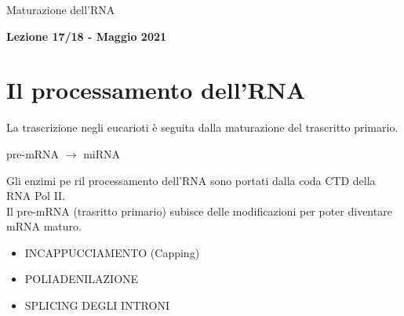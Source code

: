 \documentclass{article}
\begin{document}
\begin{titlepage}
    \begin{center}
        \vspace*{1cm}
        \huge
        Maturazione dell'RNA
            
        \vspace{1.5cm}
        
        \Large
        \textbf{Lezione 17/18 - Maggio 2021}

        \vspace{0.8cm}

    \end{center}
\end{titlepage}
\setcounter{page}{69}
\section{Il processamento dell'RNA}
La trascrizione negli eucarioti è seguita dalla maturazione del trascritto primario.
\begin{center}
    pre-mRNA $\rightarrow$ miRNA
\end{center}
Gli enzimi pe ril processamento dell'RNA sono portati dalla coda CTD della RNA Pol II.\\
Il pre-mRNA (trasritto primario) subisce delle modificazioni per poter diventare mRNA maturo.
\begin{itemize}
    \item INCAPPUCCIAMENTO (Capping)
    \item POLIADENILAZIONE
    \item SPLICING DEGLI INTRONI
\end{itemize}
\end{document}
